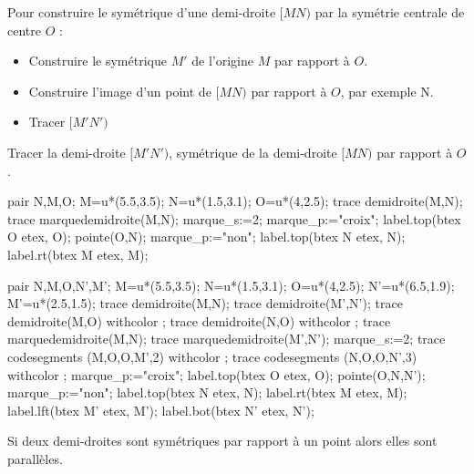 \begin{methode}
    Pour construire le symétrique d'une demi-droite $[MN)$ par la symétrie centrale de centre $O$ :
    \begin{itemize}
        \item Construire le symétrique $M'$ de l'origine $M$ par rapport à $O$.
        \item Construire l'image d'un point de $[MN)$ par rapport à $O$, par exemple N.
        \item Tracer $[M'N')$
    \end{itemize}
    \exercice
    Tracer la demi-droite $[M'N')$, symétrique de la demi-droite $[MN)$ par rapport à $O$.
    
    \bigskip
    \begin{Geometrie}[CoinHD={(8u,4u)}]
        pair N,M,O;
        M=u*(5.5,3.5);
        N=u*(1.5,3.1);
        O=u*(4,2.5);
        trace demidroite(M,N);
        trace marquedemidroite(M,N);
        marque_s:=2;
        marque_p:="croix";
        label.top(btex O etex, O);
        pointe(O,N);
        marque_p:="non";
        label.top(btex N etex, N);        
        label.rt(btex M etex, M);
    \end{Geometrie}
    \correction
    \begin{Geometrie}[CoinHD={(8u,4u)}]
        pair N,M,O,N',M';
        M=u*(5.5,3.5);
        N=u*(1.5,3.1);
        O=u*(4,2.5);
        N'=u*(6.5,1.9);
        M'=u*(2.5,1.5);
        trace demidroite(M,N);
        trace demidroite(M',N');
        trace demidroite(M,O) withcolor \myMetapostGreen;
        trace demidroite(N,O) withcolor \myMetapostGreen;
        trace marquedemidroite(M,N);
        trace marquedemidroite(M',N');
        marque_s:=2;
        trace codesegments (M,O,O,M',2) withcolor \myMetapostGreen;
        trace codesegments (N,O,O,N',3) withcolor \myMetapostGreen;
        marque_p:="croix";
        label.top(btex O etex, O);
        pointe(O,N,N');
        marque_p:="non";
        label.top(btex N etex, N);
        label.rt(btex M etex, M);
        label.lft(btex M' etex, M');
        label.bot(btex N' etex, N');
    \end{Geometrie}
\end{methode}

\begin{propriete}[\admise]
    Si deux demi-droites sont symétriques par rapport à un point alors elles sont parallèles.
\end{propriete}

